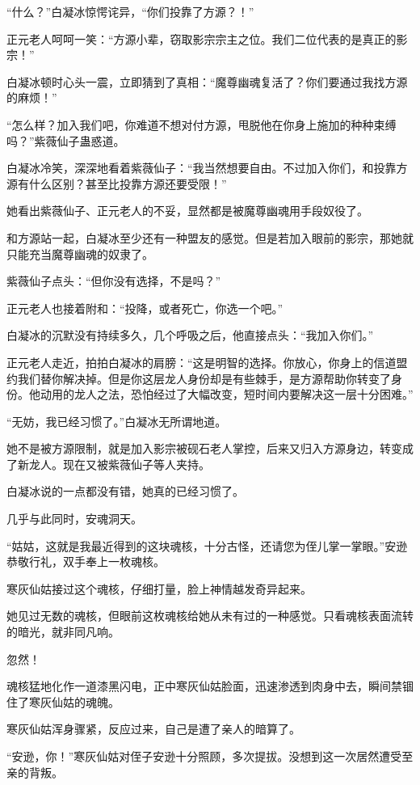 \begin{this_body}
“什么？”白凝冰惊愕诧异，“你们投靠了方源？！”

正元老人呵呵一笑：“方源小辈，窃取影宗宗主之位。我们二位代表的是真正的影宗！”

白凝冰顿时心头一震，立即猜到了真相：“魔尊幽魂复活了？你们要通过我找方源的麻烦！”

“怎么样？加入我们吧，你难道不想对付方源，甩脱他在你身上施加的种种束缚吗？”紫薇仙子蛊惑道。

白凝冰冷笑，深深地看着紫薇仙子：“我当然想要自由。不过加入你们，和投靠方源有什么区别？甚至比投靠方源还要受限！”

她看出紫薇仙子、正元老人的不妥，显然都是被魔尊幽魂用手段奴役了。

和方源站一起，白凝冰至少还有一种盟友的感觉。但是若加入眼前的影宗，那她就只能充当魔尊幽魂的奴隶了。

紫薇仙子点头：“但你没有选择，不是吗？”

正元老人也接着附和：“投降，或者死亡，你选一个吧。”

白凝冰的沉默没有持续多久，几个呼吸之后，他直接点头：“我加入你们。”

正元老人走近，拍拍白凝冰的肩膀：“这是明智的选择。你放心，你身上的信道盟约我们替你解决掉。但是你这层龙人身份却是有些棘手，是方源帮助你转变了身份。他动用的龙人之法，恐怕经过了大幅改变，短时间内要解决这一层十分困难。”

“无妨，我已经习惯了。”白凝冰无所谓地道。

她不是被方源限制，就是加入影宗被砚石老人掌控，后来又归入方源身边，转变成了新龙人。现在又被紫薇仙子等人夹持。

白凝冰说的一点都没有错，她真的已经习惯了。

几乎与此同时，安魂洞天。

“姑姑，这就是我最近得到的这块魂核，十分古怪，还请您为侄儿掌一掌眼。”安逊恭敬行礼，双手奉上一枚魂核。

寒灰仙姑接过这个魂核，仔细打量，脸上神情越发奇异起来。

她见过无数的魂核，但眼前这枚魂核给她从未有过的一种感觉。只看魂核表面流转的暗光，就非同凡响。

忽然！

魂核猛地化作一道漆黑闪电，正中寒灰仙姑脸面，迅速渗透到肉身中去，瞬间禁锢住了寒灰仙姑的魂魄。

寒灰仙姑浑身骤紧，反应过来，自己是遭了亲人的暗算了。

“安逊，你！”寒灰仙姑对侄子安逊十分照顾，多次提拔。没想到这一次居然遭受至亲的背叛。


\end{this_body}

